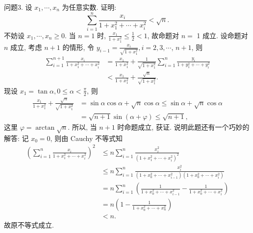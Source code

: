 问题3. 设 $x_1, \cdots, x_n$ 为任意实数.
证明:
$$
\sum_{i=1}^n \frac{x_i}{1+x_1^2+\cdots+x_i^2}<\sqrt{n} .
$$
不妨设 $x_1, \cdots, x_n \geqslant 0$. 当 $n=1$ 时, $\frac{x_1}{1+x_1^2} \leqslant \frac{1}{2}<1$, 故命题对 $n=$ 1 成立.
设命题对 $n$ 成立, 考虑 $n+1$ 的情形, 令 $y_{i-1}=\frac{x_i}{\sqrt{1+x_1^2}}, i=2,3, \cdots$, $n+1$, 则
$$
\begin{aligned}
\sum_{i=1}^{n+1} \frac{x_i}{1+x_1^2+\cdots+x_i^2} & =\frac{x_1}{1+x_1^2}+\frac{1}{\sqrt{1+x_1^2}} \sum_{i=1}^n \frac{y_i}{1+y_1^2+\cdots+y_i^2} \\
& <\frac{x_1}{1+x_1^2}+\frac{\sqrt{n}}{\sqrt{1+x_1^2}} .
\end{aligned}
$$
现设 $x_1=\tan \alpha, 0 \leqslant \alpha<\frac{\pi}{2}$, 则
$$
\begin{aligned}
\frac{x_1}{1+x_1^2}+\frac{\sqrt{n}}{\sqrt{1+x_1^2}} & =\sin \alpha \cos \alpha+\sqrt{n} \cos \alpha \leqslant \sin \alpha+\sqrt{n} \cos \alpha \\
& =\sqrt{n+1} \sin (\alpha+\varphi) \leqslant \sqrt{n+1},
\end{aligned}
$$
这里 $\varphi=\arctan \sqrt{n}$.
所以, 当 $n+1$ 时命题成立, 获证.
说明此题还有一个巧妙的解答: 记 $x_0=0$, 则由 Cauchy 不等式知
$$
\begin{aligned}
\left(\sum_{i=1}^n \frac{x_i}{1+x_1^2+\cdots+x_i^2}\right)^2 & \leqslant n \sum_{i=1}^n \frac{x_i^2}{\left(1+x_1^2+\cdots+x_i^2\right)^2} \\
& \leqslant n \sum_{i=1}^n \frac{x_i^2}{\left(1+x_0^2+\cdots+x_{i-1}^2\right)\left(1+x_0^2+\cdots+x_i^2\right)} \\
& =n \sum_{i=1}^n\left(\frac{1}{1+x_0^2+\cdots+x_{i-1}^2}-\frac{1}{1+x_0^2+\cdots+x_i^2}\right) \\
& =n\left(1-\frac{1}{1+x_0^2+\cdots+x_n^2}\right) \\
& <n .
\end{aligned}
$$
故原不等式成立.



